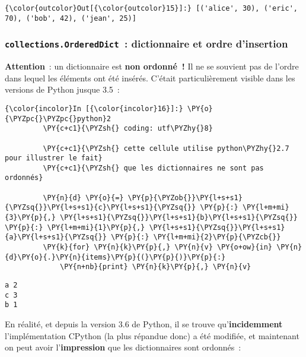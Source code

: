 \begin{Verbatim}[commandchars=\\\{\}]
{\color{outcolor}Out[{\color{outcolor}15}]:} [('alice', 30), ('eric', 70), ('bob', 42), ('jean', 25)]
\end{Verbatim}
            
    \hypertarget{collections.ordereddict-dictionnaire-et-ordre-dinsertion}{%
\subsubsection{\texorpdfstring{\texttt{collections.OrderedDict}~:
dictionnaire et ordre
d'insertion}{collections.OrderedDict~: dictionnaire et ordre d'insertion}}\label{collections.ordereddict-dictionnaire-et-ordre-dinsertion}}

    \textbf{Attention}~: un dictionnaire est \textbf{non ordonné~!} Il ne se
souvient pas de l'ordre dans lequel les éléments ont été insérés.
C'était particulièrement visible dans les versions de Python jusque
3.5~:

    \begin{Verbatim}[commandchars=\\\{\}]
{\color{incolor}In [{\color{incolor}16}]:} \PY{o}{\PYZpc{}\PYZpc{}python}2
         \PY{c+c1}{\PYZsh{} coding: utf\PYZhy{}8}
         
         \PY{c+c1}{\PYZsh{} cette cellule utilise python\PYZhy{}2.7 pour illustrer le fait}
         \PY{c+c1}{\PYZsh{} que les dictionnaires ne sont pas ordonnés}
         
         \PY{n}{d} \PY{o}{=} \PY{p}{\PYZob{}}\PY{l+s+s1}{\PYZsq{}}\PY{l+s+s1}{c}\PY{l+s+s1}{\PYZsq{}} \PY{p}{:} \PY{l+m+mi}{3}\PY{p}{,} \PY{l+s+s1}{\PYZsq{}}\PY{l+s+s1}{b}\PY{l+s+s1}{\PYZsq{}} \PY{p}{:} \PY{l+m+mi}{1}\PY{p}{,} \PY{l+s+s1}{\PYZsq{}}\PY{l+s+s1}{a}\PY{l+s+s1}{\PYZsq{}} \PY{p}{:} \PY{l+m+mi}{2}\PY{p}{\PYZcb{}}
         \PY{k}{for} \PY{n}{k}\PY{p}{,} \PY{n}{v} \PY{o+ow}{in} \PY{n}{d}\PY{o}{.}\PY{n}{items}\PY{p}{(}\PY{p}{)}\PY{p}{:}
             \PY{n+nb}{print} \PY{n}{k}\PY{p}{,} \PY{n}{v}
\end{Verbatim}


    \begin{Verbatim}[commandchars=\\\{\}]
a 2
c 3
b 1

    \end{Verbatim}

    En réalité, et depuis la version 3.6 de Python, il se trouve
qu'\textbf{incidemment} l'implémentation CPython (la plus répandue donc)
a été modifiée, et maintenant on peut avoir l'\textbf{impression} que
les dictionnaires sont ordonnés~:

